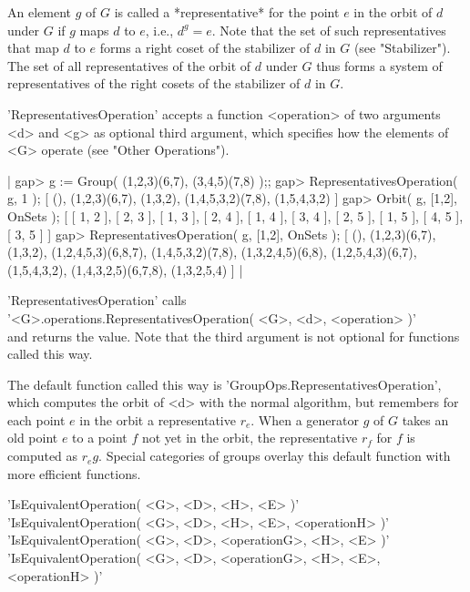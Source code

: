 An element $g$ of $G$ is called a  *representative*  for the point $e$ in
the orbit of $d$ under $G$ if $g$ maps $d$ to $e$, i.e., $d^g = e$.  Note
that the set  of such representatives  that map $d$ to $e$  forms a right
coset of the stabilizer of $d$ in $G$ (see "Stabilizer").  The set of all
representatives of the orbit  of  $d$ under $G$  thus  forms a system  of
representatives of the right cosets of the stabilizer of $d$ in $G$.

'RepresentativesOperation' accepts    a  function   <operation>  of   two
arguments <d> and <g> as optional third argument, which specifies how the
elements of <G> operate (see "Other Operations").

|    gap> g := Group( (1,2,3)(6,7), (3,4,5)(7,8) );;
    gap> RepresentativesOperation( g, 1 );
    [ (), (1,2,3)(6,7), (1,3,2), (1,4,5,3,2)(7,8), (1,5,4,3,2) ]
    gap> Orbit( g, [1,2], OnSets );
    [ [ 1, 2 ], [ 2, 3 ], [ 1, 3 ], [ 2, 4 ], [ 1, 4 ], [ 3, 4 ],
      [ 2, 5 ], [ 1, 5 ], [ 4, 5 ], [ 3, 5 ] ]
    gap> RepresentativesOperation( g, [1,2], OnSets );
    [ (), (1,2,3)(6,7), (1,3,2), (1,2,4,5,3)(6,8,7), (1,4,5,3,2)(7,8),
      (1,3,2,4,5)(6,8), (1,2,5,4,3)(6,7), (1,5,4,3,2), (1,4,3,2,5)(6,7,8),
      (1,3,2,5,4) ] |

'RepresentativesOperation' calls \\
'<G>.operations.RepresentativesOperation( <G>, <d>, <operation> )' \\
and returns the value.  Note that the third  argument is not optional for
functions called this way.

The       default       function      called       this       way      is
'GroupOps.RepresentativesOperation', which computes the orbit of <d> with
the  normal  algorithm,  but remembers  for each point $e$ in the orbit a
representative $r_e$.  When a generator $g$ of $G$ takes an old point $e$
to a point $f$ not yet in the orbit, the representative $r_f$ for  $f$ is
computed as $r_e  g$.  Special categories of  groups overlay this default
function with more efficient functions.


'IsEquivalentOperation( <G>, <D>, <H>, <E> )' \\
'IsEquivalentOperation( <G>, <D>, <H>, <E>, <operationH> )' \\
'IsEquivalentOperation( <G>, <D>, <operationG>, <H>, <E> )' \\
'IsEquivalentOperation( <G>, <D>, <operationG>, <H>, <E>, <operationH> )'

